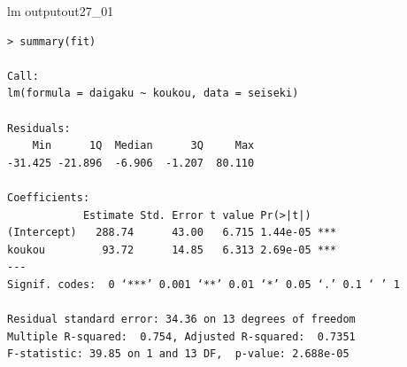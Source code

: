 \begin{Rscreen}{lm output}{out27_01}
   \begin{verbatim}
> summary(fit)

Call:
lm(formula = daigaku ~ koukou, data = seiseki)

Residuals:
    Min      1Q  Median      3Q     Max 
-31.425 -21.896  -6.906  -1.207  80.110 

Coefficients:
            Estimate Std. Error t value Pr(>|t|)    
(Intercept)   288.74      43.00   6.715 1.44e-05 ***
koukou         93.72      14.85   6.313 2.69e-05 ***
---
Signif. codes:  0 ‘***’ 0.001 ‘**’ 0.01 ‘*’ 0.05 ‘.’ 0.1 ‘ ’ 1

Residual standard error: 34.36 on 13 degrees of freedom
Multiple R-squared:  0.754,	Adjusted R-squared:  0.7351 
F-statistic: 39.85 on 1 and 13 DF,  p-value: 2.688e-05
\end{verbatim}
\end{Rscreen}
